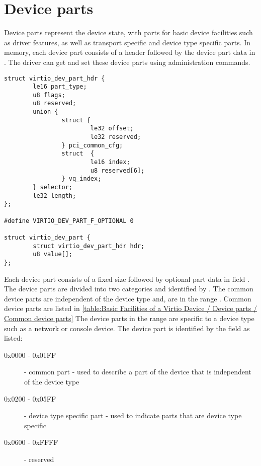 \section{Device parts}\label{sec:Basic Facilities of a Virtio Device / Device parts}

Device parts represent the device state, with parts for basic
device facilities such as driver features, as well as transport specific
and device type specific parts. In memory, each device part consists
of a header  followed by
the device part data in . The driver can get and set
these device parts using administration commands.

\begin{lstlisting}
struct virtio_dev_part_hdr {
        le16 part_type;
        u8 flags;
        u8 reserved;
        union {
                struct {
                        le32 offset;
                        le32 reserved;
                } pci_common_cfg;
                struct  {
                        le16 index;
                        u8 reserved[6];
                } vq_index;
        } selector;
        le32 length;
};

#define VIRTIO_DEV_PART_F_OPTIONAL 0

struct virtio_dev_part {
        struct virtio_dev_part_hdr hdr;
        u8 value[];
};

\end{lstlisting}

Each device part consists of a fixed size  followed by optional
part data in field . The device parts are divided into
two categories and identified by . The common device parts are
independent of the device type and, are in the range . Common
device parts are listed in
\ref{table:Basic Facilities of a Virtio Device / Device parts / Common device parts}
The device parts in the range  are specific to a device type
such as a network or console device.
The device part is identified by the  field as listed:

\begin{description}
\item[0x0000 - 0x01FF] - common part - used to describe a part of the device that
                         is independent of the device type
\item[0x0200 - 0x05FF] - device type specific part - used to indicate parts
                         that are device type specific
\item[0x0600 - 0xFFFF] - reserved
\end{description}

